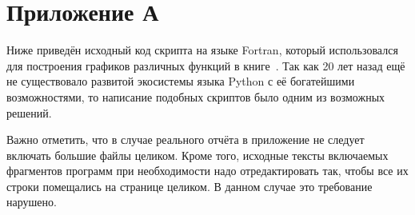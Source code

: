 \section{Приложение А}

Ниже приведён исходный код скрипта на языке Fortran, который использовался для
построения графиков различных функций в книге~\cite{roganov-jurists}.
Так как 20 лет назад ещё не существовало развитой экосистемы языка Python
с её богатейшими возможностями, то написание подобных скриптов было одним
из возможных решений.

Важно отметить, что в случае реального отчёта в приложение не следует включать
большие файлы целиком. Кроме того, исходные тексты включаемых фрагментов
программ при необходимости надо отредактировать так, чтобы все их строки
помещались на странице целиком. В данном случае это требование нарушено.



